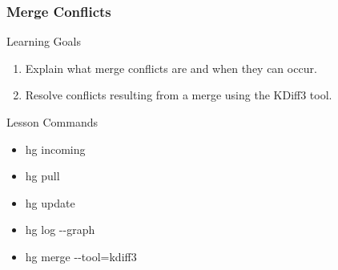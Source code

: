 \documentclass{beamer}
\renewcommand{\dh}{{-}{-}}
\begin{document}
\begin{frame}[label=merge-conflicts]
  \frametitle{Merge Conflicts}
  \begin{block}{Learning Goals}
    \begin{enumerate}
    \item Explain what merge conflicts are and when they can occur.
    \item Resolve conflicts resulting from a merge using the KDiff3 tool.
    \end{enumerate}
  \end{block}
  \begin{block}{Lesson Commands}
    \begin{itemize}
      \item hg incoming
      \item hg pull
      \item hg update
      \item hg log \dh graph
      \item hg merge \dh tool=kdiff3
    \end{itemize}
  \end{block}
\end{frame}
\end{document}
